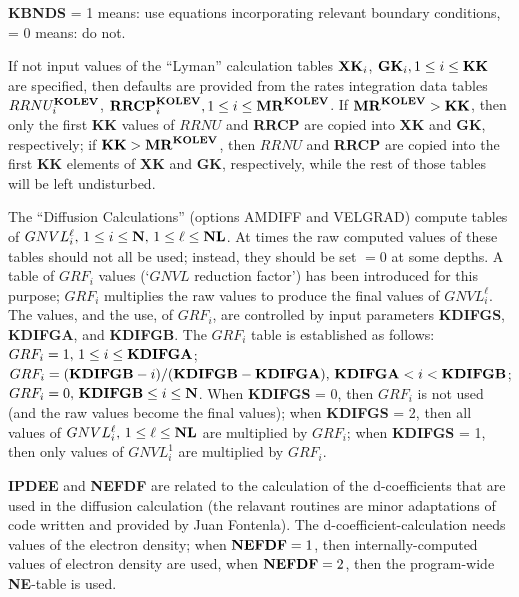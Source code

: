 {\bf KBNDS} = 1 means: use equations incorporating relevant boundary conditions, = 0
means: do not.
\ej
\centerline{}
\space \noindent
If not input values of the ``Lyman'' calculation tables ${\bf XK}_i$,
${\bf GK}_i, 1 \leq i \leq {\bf KK}$ are specified, then defaults are provided from the
rates integration data tables \break $RRNU^{\bf KOLEV}_i$, ${\bf RRCP}^{\bf KOLEV}_i,
1 \leq i \leq {\bf MR}^{\bf KOLEV}$. If ${\bf MR}^{\bf KOLEV} > {\bf KK}$, then only
the first {\bf KK} values of $RRNU$ and {\bf RRCP} are copied into {\bf XK} and
{\bf GK}, respectively; if ${\bf KK} > {\bf MR}^{\bf KOLEV}$, then $RRNU$ and
{\bf RRCP} are copied into the first {\bf KK} elements of {\bf XK} and {\bf GK},
respectively, while the rest of those tables will be left undisturbed.
\blankline
\blankline
\centerline{}
\space \noindent
The ``Diffusion Calculations'' (options AMDIFF and VELGRAD) 
compute tables of $GNVL^\ell_i, \, 1 \leq i \leq {\bf N}, \,
1 \leq \ell \leq {\bf NL}$. At times the raw computed values of these tables should not all
be used; instead, they should be set $= 0$ at some depths. A table of $GRF_i$ values (`$GNVL$
reduction factor') has been introduced for this purpose; $GRF_i$ multiplies the raw values
to produce the final values of $GNVL^\ell_i$. The values, and the use, of $GRF_i$,
are controlled by input parameters {\bf KDIFGS}, {\bf KDIFGA}, and {\bf KDIFGB}. \np
The $GRF_i$ table is established as follows: $GRF_i = 1, \, 1 \leq i \leq {\bf KDIFGA}$; \break
$GRF_i = ({\bf KDIFGB} - i)/({\bf KDIFGB} - {\bf KDIFGA}), \, {\bf KDIFGA} < i < {\bf KDIFGB}$;
$GRF_i = 0, \, {\bf KDIFGB} \leq i \leq {\bf N}$. \np
When {\bf KDIFGS} = 0, then $GRF_i$ is not used (and the raw values become the final values);
when {\bf KDIFGS} = 2, then all values of $GNVL_i^\ell, \, 1 \leq \ell \leq {\bf NL}$
are multiplied by $GRF_i$;
when {\bf KDIFGS} = 1, then only values of $GNVL_i^1$ are multiplied by $GRF_i$.
\blankline
\blankline
\centerline{}
\space \noindent
{\bf IPDEE} and {\bf NEFDF} are related to the calculation of the d-coefficients that are
used in the diffusion calculation (the relavant routines are minor adaptations of code
written and provided by Juan Fontenla). The d-coefficient-calculation needs values of
the electron density; when ${\bf NEFDF} = 1$, then internally-computed values of electron
density are used, when ${\bf NEFDF} = 2$, then the program-wide {\bf NE}-table is used. \np
